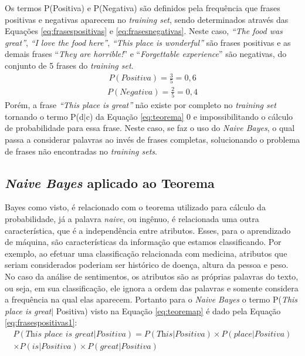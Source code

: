 Os termos P(Positiva) e P(Negativa) são definidos pela frequência que frases
positivas e negativas aparecem no \textit{training set}, sendo determinados
através das Equações \ref{eq:frasespositivas} e \ref{eq:frasesnegativas}. Neste
caso, \textit{``The food was great''}, \textit{``I love the food here''}, \textit{``This place is
wonderful''} são frases positivas e as demais frases ``\textit{They are horrible!}'' e
``\textit{Forgettable experience}'' são negativas, do conjunto de 5 frases do
\textit{training set}.
\begin{equation}
\begin{gathered}
P(Positiva)
=
\frac{3}{5} = 0,6
\label{eq:frasespositivas}
\end{gathered}
\end{equation}
\begin{equation}
\begin{gathered}
P(Negativa)
=
\frac{2}{5} = 0,4
\label{eq:frasesnegativas}
\end{gathered}
\end{equation}
Porém, a frase \textit{``This place is great''} não existe por completo no
\textit{training set} tornando o termo P(d$\vert$c) da Equação
\ref{eq:teorema} 0 e impossibilitando o cálculo de probabilidade para essa frase.
Neste caso, se faz o uso do \textit{Naive Bayes}, o qual passa a
considerar palavras ao invés de frases completas, solucionando o problema de
frases não encontradas no \textit{training sets}.

\subsection{\textit{Naive Bayes} aplicado ao Teorema}

Bayes como visto, é relacionado com o teorema utilizado para cálculo da
probabilidade, já a palavra \textit{naive}, ou ingênuo, é relacionada uma
outra característica, que é a
independência entre atributos. Esses, para o aprendizado de máquina, são
características da informação que estamos classificando. Por exemplo, ao efetuar uma classificação relacionada com medicina, atributos que seriam considerados poderiam ser histórico de doença, altura da pessoa e peso. No caso da análise de sentimentos, os atributos
são as próprias palavras do texto, ou seja, em sua classificação, ele ignora a
ordem das palavras e somente considera a frequência na qual elas aparecem.
Portanto para o \textit{Naive Bayes} o termo P(\textit{This place is
great}$\vert$ Positiva) visto na Equação \ref{eq:teoremap} é dado pela Equação
\ref{eq:frasespositivas1}:
\begin{equation}
\begin{gathered}
P(\textit{This place is great}|Positiva) = P(\textit{This}|Positiva)
\times P(\textit{place}|Positiva) \\ \times P(\textit{is}|Positiva) \times
P(\textit{great}|Positiva)
\label{eq:frasespositivas1}
\end{gathered}
\end{equation}

